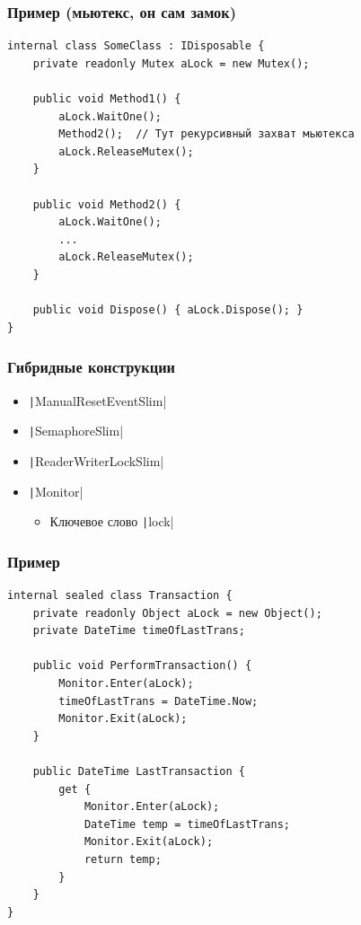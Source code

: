 \documentclass[xetex,mathserif,serif]{beamer}
\begin{document}
	\begin{frame}[fragile]
		\frametitle{Пример (мьютекс, он сам замок)}
		\begin{small}
			\begin{verbatim}
internal class SomeClass : IDisposable {
    private readonly Mutex aLock = new Mutex();

    public void Method1() {
        aLock.WaitOne();
        Method2();  // Тут рекурсивный захват мьютекса
        aLock.ReleaseMutex();
    }

    public void Method2() {
        aLock.WaitOne();
        ...
        aLock.ReleaseMutex();
    }

    public void Dispose() { aLock.Dispose(); }
}
			\end{verbatim}
		\end{small}
	\end{frame}

	\begin{frame}
		\frametitle{Гибридные конструкции}
		\begin{itemize}
			\item \texttt|ManualResetEventSlim|
			\item \texttt|SemaphoreSlim|
			\item \texttt|ReaderWriterLockSlim|
			\item \texttt|Monitor|
			\begin{itemize}
				\item Ключевое слово \texttt|lock|
			\end{itemize}
		\end{itemize}
	\end{frame}

	\begin{frame}[fragile]
		\frametitle{Пример}
		\begin{footnotesize}
			\begin{verbatim}
internal sealed class Transaction {
    private readonly Object aLock = new Object(); 
    private DateTime timeOfLastTrans;

    public void PerformTransaction() {
        Monitor.Enter(aLock);
        timeOfLastTrans = DateTime.Now;
        Monitor.Exit(aLock);
    }

    public DateTime LastTransaction {
        get { 
            Monitor.Enter(aLock); 
            DateTime temp = timeOfLastTrans;
            Monitor.Exit(aLock); 
            return temp;
        }
    }
}
			\end{verbatim}
		\end{footnotesize}
	\end{frame}
\end{document}
